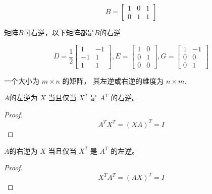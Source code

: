 \begin{example}
    \begin{equation} B=\left[\begin{array}{lll}1 & 0 & 1 \\ 0 & 1 & 1\end{array}\right] \end{equation}

    矩阵$B$可右逆，以下矩阵都是$B$的右逆

    \begin{equation} D=\frac{1}{2}\left[\begin{array}{cc}1 & -1 \\ -1 & 1 \\ 1 & 1\end{array}\right], E=\left[\begin{array}{ll}1 & 0 \\ 0 & 1 \\ 0 & 0\end{array}\right], G=\left[\begin{array}{cc}1 & -1 \\ 0 & 0 \\ 0 & 1\end{array}\right] \end{equation}
\end{example}

\begin{theorem}
一个大小为 $ m \times n $ 的矩阵， 其左逆或右逆的维度为 $ n \times m $.
\end{theorem}


\begin{theorem}
    $A$的左逆为 $ X $ 当且仅当 $ X^{T} $ 是 $ A^{T} $ 的右逆。
\end{theorem}

\begin{proof}
    \begin{equation}
A^{T} X^{T}=(X A)^{T}=I
\end{equation}
\end{proof}

\begin{theorem}
    $A$的右逆为 $ X $ 当且仅当 $ X^{T} $ 是 $ A^{T} $ 的左逆。
\end{theorem}

\begin{proof}
    \begin{equation}
X^{T} A^{T}=(A X)^{ {T}}=I
\end{equation}
\end{proof}


